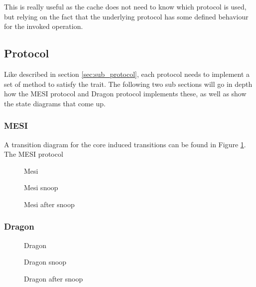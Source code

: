 This is really useful as the cache does not need to know which protocol is used, but relying on the
fact that the underlying protocol has some defined behaviour for the invoked operation.


\subsection{Protocol}
Like described in section \ref{sec:sub_protocol}, each protocol needs to implement a set of method
to satisfy the trait.  The following two sub sections will go in depth how the MESI protocol and
Dragon protocol implements these, as well as show the state diagrams that come up.

\subsubsection{MESI}

A transition diagram for the core induced transitions can be found in Figure \ref{fig:mesi}.
The MESI protocol

\begin{figure}[H]
    \centering
    \caption{Mesi}
    \label{fig:mesi}
\end{figure}

\begin{figure}[ht]
    \centering
    \caption{Mesi snoop}
    \label{fig:mesi_snoop}
\end{figure}

\begin{figure}[ht]
    \centering
    \caption{Mesi after snoop}
    \label{fig:mesi_after_snoop}
\end{figure}

\subsubsection{Dragon}

\begin{figure}[ht]
    \centering
    \caption{Dragon}
    \label{fig:dragon}
\end{figure}


\begin{figure}[ht]
    \centering
    \caption{Dragon snoop}
    \label{fig:dragon_snoop}
\end{figure}

\begin{figure}[ht]
    \centering
    \caption{Dragon after snoop}
    \label{fig:dragon_after_snoop}
\end{figure}
